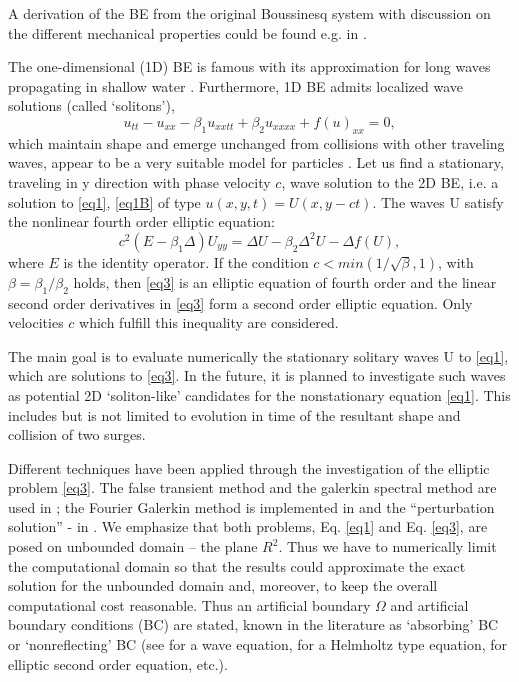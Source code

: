 \documentclass[12pt]{article}
\theoremstyle{theorem}
\theoremstyle{defi}
\begin{document}
A derivation of the BE from the original Boussinesq system with discussion on the different mechanical properties could be found e.g. in \cite{ref1}.

The one-dimensional (1D) BE is famous with its approximation for long waves propagating in shallow water \cite{ref2, ref3}. Furthermore, 1D BE admits localized wave solutions (called ‘solitons’),
$$
u_{tt} - u_{xx} -\beta_1  u_{xxtt} +\beta_2 u_{xxxx} + f(u)_{xx} =0,
$$
which maintain shape and emerge unchanged from collisions with other traveling waves, appear to be a very suitable model for particles \cite{ref4, ref5}.
Let us find a stationary, traveling in y direction with phase velocity $c$, wave solution to the 2D BE, i.e. a solution to \eqref{eq1}, \eqref{eq1B} of type $u(x,y,t)=U(x,y - ct)$. The waves U satisfy the nonlinear fourth order elliptic equation:
\begin{equation}
c^2 (E-\beta_1 \Delta) U_{yy} = \Delta U -\beta_2 \Delta^2 U - \Delta f(U), \label{eq3}
\end{equation}
where $E$ is the identity operator. If the condition $c<min(1/\sqrt{\beta}, 1)$, with $\beta = \beta_1/\beta_2$ holds, then \eqref{eq3} is an elliptic equation of fourth order and the linear second order derivatives in \eqref{eq3} form a second order elliptic equation. Only velocities $c$ which fulfill this inequality are considered.

The main goal is to evaluate numerically the stationary solitary waves U to \eqref{eq1}, which are solutions to \eqref{eq3}. In the future, it is planned to investigate such waves as potential 2D  ‘soliton-like’ candidates for the nonstationary equation \eqref{eq1}. This includes but is not limited to evolution in time of the resultant shape and collision of two surges.

Different techniques have been applied through the investigation of the elliptic problem \eqref{eq3}. The false transient method and the galerkin spectral method are used in \cite{ref6,ref9} ; the Fourier Galerkin method is implemented in \cite{ref8,ref9} and the ``perturbation solution” - in \cite{ref10}.
We emphasize that both problems, Eq. \eqref{eq1} and Eq. \eqref{eq3}, are posed on unbounded domain – the plane $R^2$. Thus we have to numerically limit the computational domain so that the results could approximate the exact solution for the unbounded domain and, moreover, to keep the overall computational cost reasonable.
Thus an artificial boundary $\Omega$ and artificial boundary conditions (BC) are stated, known in the literature as ‘absorbing’ BC or ‘nonreflecting’ BC (see \cite{ref11} for a wave equation, \cite{ref12} for a Helmholtz type equation, \cite{ref13} for elliptic second order equation, etc.).
\end{document}
